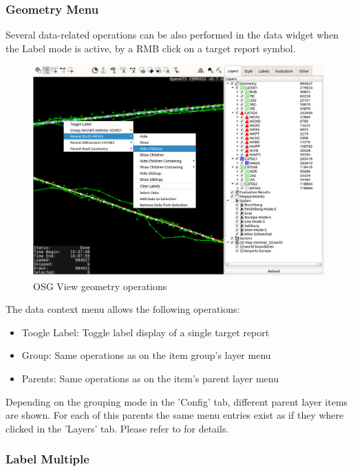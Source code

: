 \subsubsection{Geometry Menu}

Several data-related operations can be also performed in the data widget when the Label mode is active, by a RMB click on a target report symbol.

\begin{figure}[H]
    \hspace*{-2.5cm}
    \includegraphics[width=19cm,frame]{figures/osgview_data_operations.png}
  \caption{OSG View geometry operations}
\end{figure}

The data context menu allows the following operations:

\begin{itemize}
 \item Toogle Label: Toggle label display of a single target report
 \item Group: Same operations as on the item group's layer menu
 \item Parents: Same operations as on the item's parent layer menu
\end{itemize}

Depending on the grouping mode in the 'Config' tab, different parent layer items are shown. For each of this parents the same menu entries exist as if they where clicked in the 'Layers' tab. Please refer to  for details.

\subsubsection{Label Multiple}

